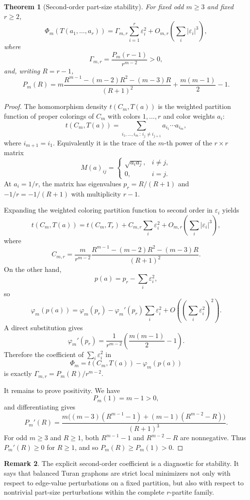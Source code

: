 \documentclass[11pt]{article}
\newtheorem{theorem}{Theorem}[section]
\theoremstyle{definition}
\newtheorem{remark}[theorem]{Remark}
\newcommand{\eps}{\varepsilon}
\begin{document}
\begin{theorem}[Second-order part-size stability]
For fixed odd $m\ge3$ and fixed $r\ge2$,
\[
        \Phi_m(T(a_1,\ldots,a_r))
        =\Gamma_{m,r}\sum_{i=1}^r\eps_i^2
        +O_{m,r}\left(\sum_i |\eps_i|^3\right),
\]
where
\[
        \Gamma_{m,r}=\frac{P_m(r-1)}{r^{m-2}}>0,
\]
and, writing $R=r-1$,
\[
        P_m(R)=
        m\frac{R^{m-1}-(m-2)R^2-(m-3)R}{(R+1)^2}
        +\frac{m(m-1)}2-1.
\]
\end{theorem}

\begin{proof}
The homomorphism density $t(C_m,T(a))$ is the weighted partition function of proper colorings of $C_m$ with colors $1,\ldots,r$ and color weights $a_i$:
\[
        t(C_m,T(a))=\sum_{i_1,\ldots,i_m\,:\, i_j\ne i_{j+1}} a_{i_1}\cdots a_{i_m},
\]
where $i_{m+1}=i_1$.  Equivalently it is the trace of the $m$-th power of the $r\times r$ matrix
\[
        M(a)_{ij}=\begin{cases}
        \sqrt{a_i a_j},& i\ne j,\\
        0,& i=j.
        \end{cases}
\]
At $a_i=1/r$, the matrix has eigenvalues $p_r=R/(R+1)$ and $-1/r=-1/(R+1)$ with multiplicity $r-1$.

Expanding the weighted coloring partition function to second order in $\eps_i$ yields
\[
        t(C_m,T(a))=t(C_m,T_r)+C_{m,r}\sum_i\eps_i^2+O_{m,r}\left(\sum_i|\eps_i|^3\right),
\]
where
\[
        C_{m,r}=\frac{m}{r^{m-2}}
        \frac{R^{m-1}-(m-2)R^2-(m-3)R}{(R+1)^2}.
\]
On the other hand,
\[
        p(a)=p_r-\sum_i\eps_i^2,
\]
so
\[
        \varphi_m(p(a))=\varphi_m(p_r)-\varphi_m'(p_r)\sum_i\eps_i^2+O\left((\sum_i\eps_i^2)^2\right).
\]
A direct substitution gives
\[
        \varphi_m'(p_r)=\frac{1}{r^{m-2}}\left(\frac{m(m-1)}2-1\right).
\]
Therefore the coefficient of $\sum_i\eps_i^2$ in
\[
        \Phi_m=t(C_m,T(a))-\varphi_m(p(a))
\]
is exactly $\Gamma_{m,r}=P_m(R)/r^{m-2}$.

It remains to prove positivity.  We have
\[
        P_m(1)=m-1>0,
\]
and differentiating gives
\[
        P_m'(R)=
        \frac{m\bigl((m-3)(R^{m-1}-1)+(m-1)(R^{m-2}-R)\bigr)}{(R+1)^3}.
\]
For odd $m\ge3$ and $R\ge1$, both $R^{m-1}-1$ and $R^{m-2}-R$ are nonnegative.  Thus $P_m'(R)\ge0$ for $R\ge1$, and so $P_m(R)\ge P_m(1)>0$.
\end{proof}

\begin{remark}
The explicit second-order coefficient is a diagnostic for stability.  It says that balanced Turan graphons are strict local minimizers not only with respect to edge-value perturbations on a fixed partition, but also with respect to nontrivial part-size perturbations within the complete $r$-partite family.
\end{remark}
\end{document}
